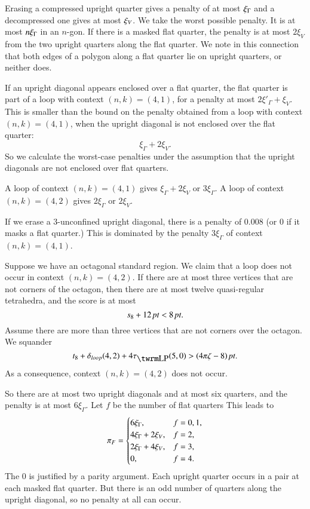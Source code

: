 Erasing a compressed upright quarter gives a penalty of
at most $\xi_\Gamma$ and a decompressed one gives at most $\xi_V$. We
take the worst possible penalty.  It is at most $n\xi_\Gamma$ in an
$n$-gon. If there is a masked flat quarter, the penalty is at most
$2\xi_V$ from the two upright quarters along the flat quarter.  We
note in this connection that both edges of a polygon along a flat
quarter lie on upright quarters, or neither does.

If an upright diagonal appears enclosed over a flat quarter, the
flat quarter is part of a loop with context $(n,k)=(4,1)$, for a
penalty at most $2\xi'_\Gamma+\xi_V$.  This is smaller than the
bound on the penalty obtained from a loop with context
$(n,k)=(4,1)$, when the upright diagonal is not enclosed over the
flat quarter:
    $$\xi_\Gamma + 2\xi_V.$$
So we calculate the worst-case penalties under the assumption that
the upright diagonals are not enclosed over flat quarters.

A loop of context $(n,k)=(4,1)$ gives $\xi_\Gamma+2\xi_V$ or
$3\xi_\Gamma$.  A loop of context $(n,k)=(4,2)$ gives
$2\xi_\Gamma$ or $2\xi_V$.

If we erase a $3$-unconfined upright diagonal, there is a penalty
of $0.008$ (or 0 if it masks a flat quarter.) This is dominated by
the penalty $3\xi_\Gamma$ of context $(n,k)=(4,1)$.

Suppose we have an octagonal standard region.  We claim that a loop
does not occur in context $(n,k)=(4,2)$. If there are at most three
vertices that are not corners of the octagon, then there are at most
twelve quasi-regular tetrahedra, and the score is at most
$$s_8 + 12\,\hbox{\it pt}<8\,\hbox{\it pt}.$$
Assume there are more than three vertices that are not corners
over the octagon. We squander
$$t_8+ \dloop(4,2)+4\tlp(5,0) > \squander.$$
As a consequence, context $(n,k)=(4,2)$ does not occur.

So there are at most two upright diagonals and at most six quarters,
and the penalty is at most $6\xi_\Gamma$. Let $f$ be the number of
flat quarters This leads to
    $$
    {\pi_F} = \begin{cases} 6\xi_\Gamma, & f=0,1,\\
                   4\xi_\Gamma+2\xi_V, & f=2,\\
                    2\xi_\Gamma+4\xi_V, & f=3,\\
                    0, & f=4.
            \end{cases}
    $$
The 0 is justified by a parity argument.  Each upright quarter
occurs in a pair at each masked flat quarter.  But there is an odd
number of quarters along the upright diagonal, so no penalty at
all can occur.

